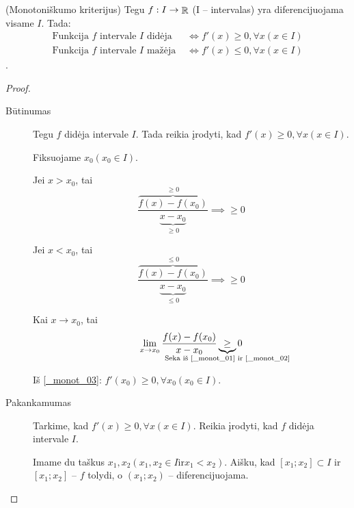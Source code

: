 \begin{prop}
  (Monotoniškumo kriterijus) Tegu $f: I \to \mathop{\mathbb{R}}$ (I – intervalas) yra
  diferencijuojama visame $I$. Tada:
  \begin{align*}
    \text{Funkcija } f \text{ intervale } I \text{ didėja } 
    &\iff f'(x) \geq 0, \forall x (x \in I) \\
    \text{Funkcija } f \text{ intervale } I \text{ mažėja } 
    &\iff f'(x) \leq 0, \forall x (x \in I)
  \end{align*}.

  \begin{proof}
    \begin{description}
      \item[Būtinumas] Tegu $f$ didėja intervale $I$. Tada reikia įrodyti,
        kad $f'(x) \geq 0, \forall x (x \in I)$. 
        
        Fiksuojame $x_{0} (x_{0} \in I)$.

        Jei $x > x_{0}$, tai
        \begin{equation}
          \frac{\overbrace{f(x) - f(x_{0})}^{\geq 0}}{
            \underbrace{x - x_{0}}_{\geq 0}} 
          \implies \geq 0
          \label{_monot_01}
        \end{equation}

        Jei $x < x_{0}$, tai
        \begin{equation}
          \frac{\overbrace{f(x) - f(x_{0})}^{\leq 0}}{
            \underbrace{x - x_{0}}_{\leq 0}}
          \implies \geq 0
          \label{_monot_02}
        \end{equation}

        Kai $x \to x_{0}$, tai 
        \begin{equation}
          \lim _{x \to x_{0}} \frac{f(x) - f(x_{0})}{x - x_{0}}
          \underbrace{\geq}_{
            \mathclap{\text{Seka iš \ref{_monot_01} ir \ref{_monot_02}}}}
          0
          \label{_monot_03}
        \end{equation}

        Iš \ref{_monot_03}: 
        $f'(x_{0}) \geq 0, \forall x_{0} (x_{0} \in I).$
      \item[Pakankamumas] Tarkime, kad 
        $f'(x) \geq 0, \forall x (x \in I)$. Reikia įrodyti, kad 
        $f$ didėja intervale $I$.

        Imame du taškus 
        $x_{1}, x_{2} (x_{1},x_{2} \in I \text{ir} x_{1} < x_{2})$.
        Aišku, kad $[x_{1};x_{2}] \subset I$ ir $[x_{1}; x_{2}]$ –
        $f$ tolydi, o $(x_{1}; x_{2})$ – diferencijuojama.


\end{description}
\end{proof}
\end{prop}
